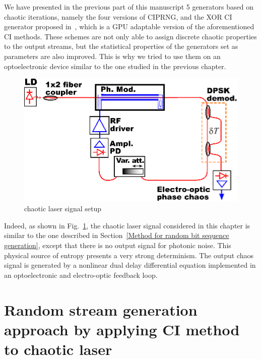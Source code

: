 We have presented in the previous part of this manuscript 5 generators based on 
chaotic iterations, namely the four versions of CIPRNG, and the XOR CI generator 
proposed in~\cite{DBLP:journals/corr/abs-1112-5239}, which is a GPU adaptable 
version of the aforementioned CI methods. 
These schemes are not only able to assign discrete chaotic properties to the output streams, but the statistical properties of the generators set as parameters are also improved.
This is why we tried to use them on an optoelectronic device similar to the
one studied in the previous chapter.

\begin{figure}
\centering
\includegraphics[scale=0.8]{setup_opto_laser.eps}
\caption{chaotic laser signal setup}
\label{chaotic laser signal}
\end{figure}
Indeed, as shown in Fig.~\ref{chaotic laser signal}, the chaotic laser signal considered
in this chapter is similar to the one described in Section~\ref{Method for random bit sequence generation}, except that there is no output signal for photonic noise. 
This physical source of entropy presents a very strong determinism. 
The output chaos signal is generated by a nonlinear dual delay differential 
equation implemented in an optoelectronic and electro-optic feedback loop.

\section{Random stream generation approach by applying CI method to chaotic laser}

